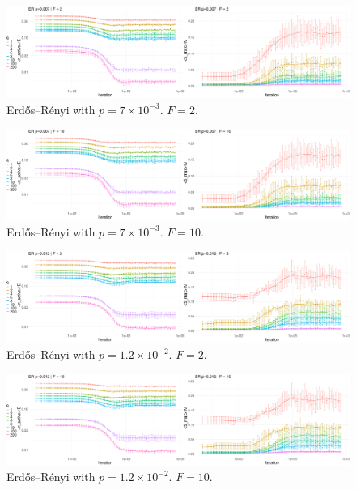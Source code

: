 \begin{figure}[h] 
    \centering
    \includegraphics[width=1\textwidth]{images/task30/ER_0-007_2.png} 
    \vspace{-0.5cm}
    \caption{Erdős–Rényi with $p=7\times10^{-3}$. $F=2$.} 
\end{figure}


\begin{figure}[h] 
    \centering
    \includegraphics[width=1\textwidth]{images/task30/ER_0-007_10.png} 
    \vspace{-0.5cm}
    \caption{Erdős–Rényi with $p=7\times10^{-3}$. $F=10$.} 
\end{figure}


\begin{figure}[h] 
    \centering
    \includegraphics[width=1\textwidth]{images/task30/ER_0-012_2.png} 
    \vspace{-0.5cm}
    \caption{Erdős–Rényi with $p=1.2\times10^{-2}$. $F=2$.} 
\end{figure}


\begin{figure}[h] 
    \centering
    \includegraphics[width=1\textwidth]{images/task30/ER_0-012_10.png} 
    \vspace{-0.5cm}
    \caption{Erdős–Rényi with $p=1.2\times10^{-2}$. $F=10$.} 
\end{figure}

